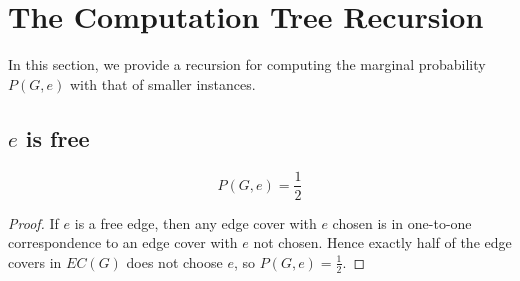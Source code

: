 \section{The Computation Tree Recursion}
In this section, we provide a recursion for computing the marginal probability $P(G, e)$ with that of smaller instances.

\subsection{$e$ is free}
\begin{proposition}
	\[P(G,e) = \frac{1}{2}\]
\end{proposition}
\begin{proof}
	If $e$ is a free edge, then any edge cover with $e$ chosen is in one-to-one correspondence to an edge cover with $e$ not chosen. Hence exactly half of the edge covers in $EC(G)$ does not choose $e$, so $P(G, e) = \frac{1}{2}$.
\end{proof}

